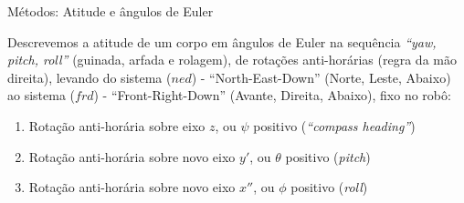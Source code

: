 \documentclass{beamer}
\begin{document}
\begin{frame}{Métodos: Atitude e ângulos de Euler}

    Descrevemos a atitude de um corpo em ângulos de Euler na sequência \emph{``yaw, pitch, roll''} (guinada, arfada e rolagem), de rotações anti-horárias (regra da mão direita), levando do sistema (\(ned\)) - ``North-East-Down'' (Norte, Leste, Abaixo) ao sistema (\(frd\)) - ``Front-Right-Down'' (Avante, Direita, Abaixo), fixo no robô:

\begin{enumerate}
    \item Rotação anti-horária sobre eixo \(z\), ou \(\psi\) positivo (\textit{``compass heading''})
    \item Rotação anti-horária sobre novo eixo \(y'\), ou \(\theta\) positivo (\textit{pitch})
    \item Rotação anti-horária sobre novo eixo \(x''\), ou \(\phi\) positivo (\textit{roll})
\end{enumerate}

\end{frame}
\end{document}
